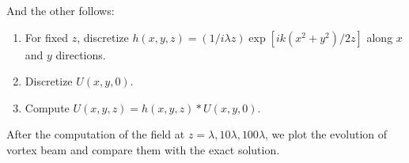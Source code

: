 And the other follows:
\begin{enumerate}
	\item For fixed $z$, discretize $h(x, y, z) = (1/i \lambda z) \exp[i k (x^2 + y^2) / 2z]$ along $x$ and $y$ directions.
	\item Discretize $U(x, y, 0)$.
	\item Compute $U(x, y, z) = h(x, y, z) * U(x, y, 0)$.
\end{enumerate}

After the computation of the field at $z = \lambda, 10\lambda, 100\lambda$, we plot the evolution of vortex beam and compare them with the exact solution.

